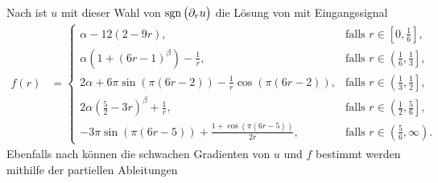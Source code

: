 Nach  ist $u$ mit dieser Wahl von
$\operatorname{sgn}\big(\partial_r u\big)$ die Lösung von  mit
Eingangssignal
\begin{align*}
  f(r)
  &=
  \begin{cases}
    \alpha-12(2-9r), 
    & \text{falls } r\in \left[0,\frac{1}{6}\right],\\
    \alpha\left(1+(6r-1)^\beta\right)-\frac{1}{r}, 
    & \text{falls } r\in \left(\frac{1}{6}, \frac{1}{3}\right],\\
    2\alpha+6\pi\sin(\pi(6r-2))-\frac{1}{r}\cos(\pi(6r-2)), 
    & \text{falls } r\in \left(\frac{1}{3}, \frac{1}{2}\right],\\
    2\alpha\left(\frac{5}{2}-3r\right)^\beta+\frac{1}{r},
    & \text{falls } r\in \left(\frac{1}{2}, \frac{5}{6}\right],\\
    -3\pi\sin(\pi(6r-5))+\frac{1+\cos(\pi(6r-5))}{2r}, 
    & \text{falls } r\in \left(\frac{5}{6}, \infty\right).
  \end{cases}
\end{align*}
Ebenfalls nach  können die schwachen
Gradienten von $u$ und $f$ bestimmt werden mithilfe der partiellen 
Ableitungen

